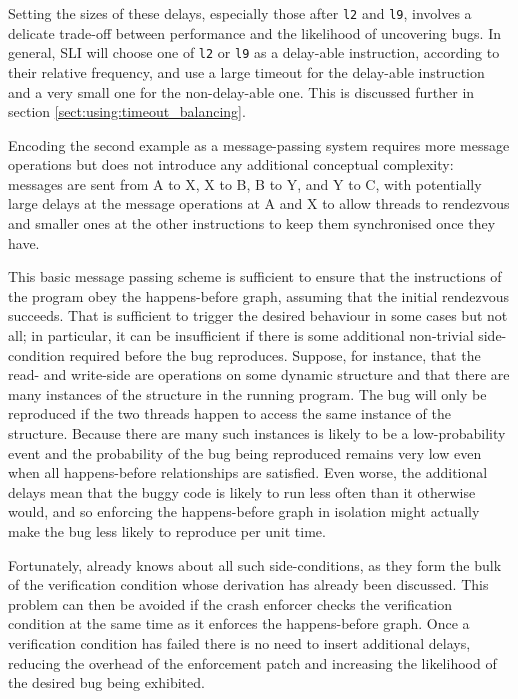 Setting the sizes of these delays, especially those after \verb|l2|
and \verb|l9|, involves a delicate trade-off between performance and
the likelihood of uncovering bugs.  In general, SLI will choose one of
\verb|l2| or \verb|l9| as a delay-able instruction, according to their
relative frequency, and use a large timeout for the delay-able
instruction and a very small one for the non-delay-able one.  This is
discussed further in section \ref{sect:using:timeout_balancing}.

Encoding the second example as a message-passing system requires more
message operations but does not introduce any additional conceptual
complexity: messages are sent from A to X, X to B, B to Y, and Y to C,
with potentially large delays at the message operations at A and X to
allow threads to rendezvous and smaller ones at the other instructions
to keep them synchronised once they have.

This basic message passing scheme is sufficient to ensure that the
instructions of the program obey the happens-before graph, assuming
that the initial rendezvous succeeds.  That is sufficient to trigger
the desired behaviour in some cases but not all; in particular, it can
be insufficient if there is some additional non-trivial side-condition
required before the bug reproduces.  Suppose, for instance, that the
read- and write-side {\StateMachines} are operations on some dynamic
structure and that there are many instances of the structure in the
running program.  The bug will only be reproduced if the two threads
happen to access the same instance of the structure.  Because there
are many such instances is likely to be a low-probability event and
the probability of the bug being reproduced remains very low even when
all happens-before relationships are satisfied.  Even worse, the
additional delays mean that the buggy code is likely to run less often
than it otherwise would, and so enforcing the happens-before graph in
isolation might actually make the bug less likely to reproduce per
unit time.

Fortunately, {\technique} already knows about all such
side-conditions, as they form the bulk of the verification condition
whose derivation has already been discussed.  This problem can then be
avoided if the crash enforcer checks the verification condition at the
same time as it enforces the happens-before graph.  Once a
verification condition has failed there is no need to insert
additional delays, reducing the overhead of the enforcement patch and
increasing the likelihood of the desired bug being exhibited.

